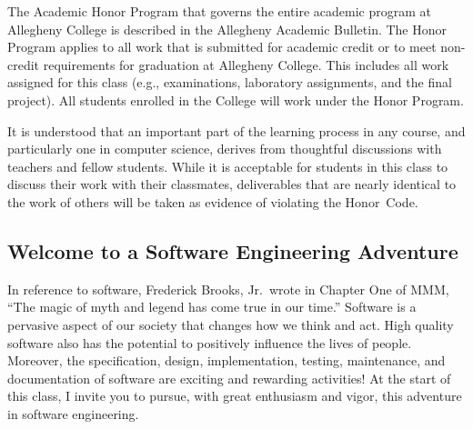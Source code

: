 The Academic Honor Program that governs the entire academic program at Allegheny College is described in the Allegheny
Academic Bulletin.  The Honor Program applies to all work that is submitted for academic credit or to meet non-credit
requirements for graduation at Allegheny College.  This includes all work assigned for this class (e.g., examinations,
laboratory assignments, and the final project).  All students enrolled in the College will work under the Honor Program.



\noindent It is understood that an important part of the learning process in any course, and particularly one in
computer science, derives from thoughtful discussions with teachers and fellow students.  While it is acceptable for
students in this class to discuss their work with their classmates, deliverables that are nearly identical to the work
of others will be taken as evidence of violating the \mbox{Honor Code}.

\subsection*{Welcome to a Software Engineering Adventure}

In reference to software, Frederick Brooks, Jr.\ wrote in Chapter One of MMM, ``The magic of myth and legend has come
true in our time.'' Software is a pervasive aspect of our society that changes how we think and act.  High quality
software also has the potential to positively influence the lives of people. Moreover, the specification, design,
implementation, testing, maintenance, and documentation of software are exciting and rewarding activities!  At the start
of this class, I invite you to pursue, with great enthusiasm and vigor, this adventure in software engineering.


